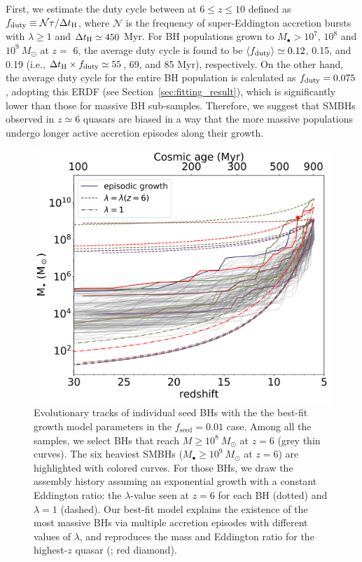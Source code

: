 \documentclass[twocolumn, twocolappendix]{aastex63}
\newcommand{\Msun}{M_\odot}
\newcommand{\tlife}{\tau}
\newcommand{\fseed}{f_\mathrm{seed}}
\begin{document}
\begin{CJK*}{UTF8}{gbsn}
First, we estimate the duty cycle between at $6\leq z\leq 10$ defined as $f_{\rm duty} \equiv \mathcal{N}\tlife/\Delta t_{\rm H}$, 
where $\mathcal{N}$ is the frequency of super-Eddington accretion bursts with $\lambda \geq 1$ and $\Delta t_{\rm H}\simeq 450$ Myr.
For BH populations grown to $M_\bullet>10^7$, $10^8$ and $10^9~\Msun$ at $z=$ 6,
the average duty cycle is found to be $\langle f_{\rm duty}\rangle \simeq 0.12$, 0.15, and 0.19
(i.e., $\Delta t_{\rm H} \times f_{\rm duty} \simeq 55$, 69, and 85 Myr), respectively.
On the other hand, the average duty cycle for the entire BH population is calculated as $f_{\rm duty}= 0.075$,
adopting this ERDF (see Section~\ref{sec:fitting_result}), which is significantly lower than those for massive BH sub-samples.
Therefore, we suggest that SMBHs observed in $z\simeq 6$ quasars are biased in a way that
the more massive populations undergo longer active accretion episodes along their growth.


\begin{figure}
\centering
\includegraphics[width=125mm]{Mevol.png}
\caption{
Evolutionary tracks of individual seed BHs with the the best-fit growth model parameters in the $\fseed=0.01$ case.
Among all the samples, we select BHs that reach $M\geq 10^8~\Msun$ at $z=6$ (grey thin curves). 
The six heaviest SMBHs ($M_\bullet \geq 10^9~\Msun$ at $z=6$) are highlighted with colored curves. 
For those BHs, we draw the assembly history assuming an exponential growth with a constant Eddington ratio: 
the $\lambda$-value seen at $z=6$ for each BH (dotted) and $\lambda =1$ (dashed).
Our best-fit model explains the existence of the most massive BHs via multiple accretion episodes with different values of $\lambda$,
and reproduces the mass and Eddington ratio for the highest-$z$ quasar (\citealt{2021ApJ...907L...1W}; red diamond).
}
\label{fig:Mevol}
\vspace{5mm}
\end{figure}
%
%



\end{CJK*}
\end{document}

